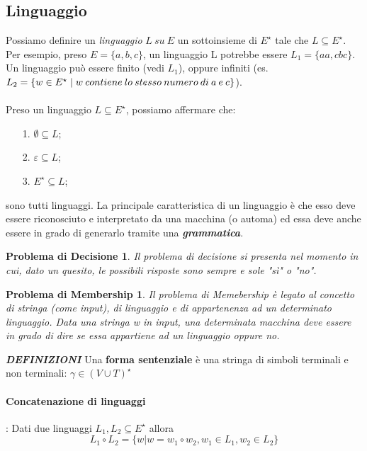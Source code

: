 \documentclass[11pt]{article}
\newtheorem*{problemaDecisione}{Problema di Decisione}
\newtheorem*{problemaMembership}{Problema di Membership}
\begin{document}
\subsection{Linguaggio} Possiamo definire un \textit{linguaggio} $L \medspace su \medspace E$ un sottoinsieme di $E^{\star}$ tale che $L \subseteq E^{\star}$. Per esempio, preso $E = \{a,b,c\}$, un linguaggio L potrebbe essere $L_{1}=\{aa,cbc\}$. Un linguaggio può essere finito (vedi $L_ {1}$), oppure infiniti (es. $L_{2} = \{ w \in E^{\star} \thickspace | \thickspace w \medspace contiene \medspace lo \medspace stesso \medspace numero \medspace di \medspace a \medspace e \medspace c\}$).
\\ \\
Preso un linguaggio $L \subseteq E^{\star}$, possiamo affermare che:
\begin{itemize}
\item[1.] $ \emptyset \subseteq L$;
\item[2.] $ \varepsilon \subseteq L $;
\item[3.] $ E^{\star} \subseteq L$;
\end{itemize}
sono tutti linguaggi. La principale caratteristica di un linguaggio è che esso deve essere riconosciuto e interpretato da una macchina (o automa) ed essa deve anche essere in grado di generarlo tramite una \textbf{\textit{grammatica}}.
\begin{problemaDecisione}
Il problema di decisione si presenta nel momento in cui, dato un quesito, le possibili risposte sono sempre e sole "sì" o "no".
\end{problemaDecisione}
\begin{problemaMembership}
Il problema di Memebership è legato al concetto di stringa (come input), di linguaggio e di appartenenza ad un determinato linguaggio. Data una stringa w in input, una determinata macchina deve essere in grado di dire se essa appartiene ad un linguaggio oppure no.
\end{problemaMembership}

\textbf{\textit{DEFINIZIONI}}
Una \textbf{forma sentenziale} è una stringa di simboli terminali e non terminali: $\gamma \in (V \cup T)^{\star}$

\paragraph{Concatenazione di linguaggi}: Dati due linguaggi $L_1, L_2 \subseteq E^{\star}$ allora $$L_1 \circ L_2 = \{ w | w = w_1 \circ w_2, w_1 \in L_1, w_2 \in L_2\} $$
\end{document}
